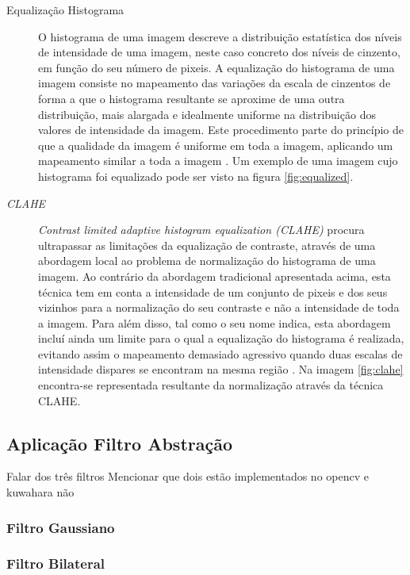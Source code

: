 \begin{description}
\item[Equalização Histograma]
O histograma de uma imagem descreve a distribuição estatística dos níveis de intensidade de uma imagem, neste caso concreto dos níveis de cinzento, em função do seu número de pixeis. A equalização do histograma de uma imagem consiste no mapeamento das variações da escala de cinzentos de forma a que o histograma resultante se aproxime de uma outra distribuição, mais alargada e idealmente uniforme na distribuição dos valores de intensidade da imagem. Este procedimento parte do princípio de que a qualidade da imagem é uniforme em toda a imagem, aplicando um mapeamento similar a toda a imagem \cite{Bradski2008}. Um exemplo de uma imagem cujo histograma foi equalizado pode ser visto na figura \ref{fig:equalized}.
\end{description}

\begin{description}
\item[\textit{CLAHE}]
\textit{Contrast limited adaptive histogram equalization (CLAHE)} procura ultrapassar as limitações da equalização de contraste, através de uma abordagem local ao problema de normalização do histograma de uma imagem. Ao contrário da abordagem tradicional apresentada acima, esta técnica tem em conta a intensidade de um conjunto de pixeis e dos seus vizinhos para a normalização do seu contraste e não a intensidade de toda a imagem. Para além disso, tal como o seu nome indica, esta abordagem incluí ainda um limite para o qual a equalização do histograma é realizada, evitando assim o mapeamento demasiado agressivo quando duas escalas de intensidade dispares se encontram na mesma região \cite{Reza2004}. Na imagem \ref{fig:clahe} encontra-se representada resultante da normalização através da técnica CLAHE.
\end{description}

\subsection{Aplicação Filtro Abstração}
Falar dos três filtros
Mencionar que dois estão implementados no opencv e kuwahara não

\subsubsection*{Filtro Gaussiano}

\subsubsection*{Filtro Bilateral}

